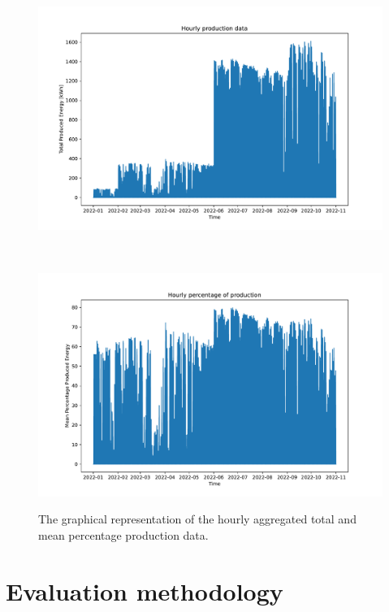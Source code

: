 \begin{figure}[H]
\begin{minipage}[b]{8.5cm}
\centering
\includegraphics[width=1\textwidth]{images/production/data_plot}
\subcaption{}
\label{fig:productiondataplot}
\end{minipage}
\ \hspace{2mm} \
\begin{minipage}[b]{8.5cm}
\centering
\includegraphics[width=1\textwidth]{images/production/data_plot_percentage}
\subcaption{}
\label{fig:productiondataplotpercentage}
\end{minipage}
\caption{The graphical representation of the hourly aggregated  total and  mean percentage production data.}
\end{figure}


\section{Evaluation methodology}
\label{sec:methodology}
\vspace{0.2 cm}


